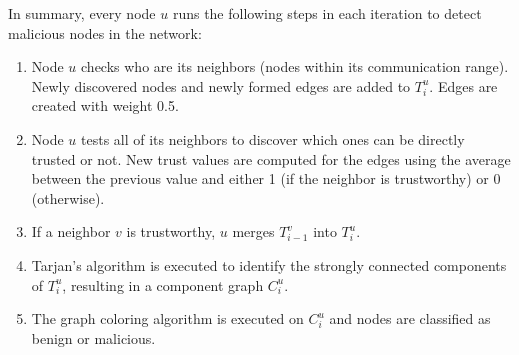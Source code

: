 \documentclass[conference]{IEEEtran}
\begin{document}
In summary, every node $u$ runs the following steps in each iteration to detect malicious nodes in the network:

\begin{enumerate}
	\item Node $u$ checks who are its neighbors (nodes within its communication range).
		  Newly discovered nodes and newly formed edges are added to $T^u_i$.
		  Edges are created with weight 0.5.
	\item Node $u$ tests all of its neighbors to discover which ones can be directly trusted or not.
		  New trust values are computed for the edges using the average between the previous value and either 1 (if the neighbor is trustworthy) or 0 (otherwise).
	\item If a neighbor $v$ is trustworthy, $u$ merges $T^v_{i-1}$ into $T^u_i$.
	\item Tarjan's algorithm is executed to identify the strongly connected components of $T^u_i$, resulting in a component graph $C^u_i$.
	\item The graph coloring algorithm is executed on $C^u_i$ and nodes are classified as benign or malicious. %
\end{enumerate}

%




\end{document}
